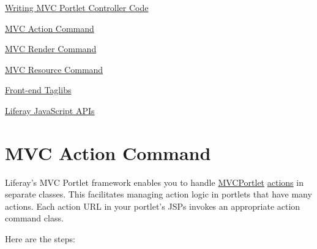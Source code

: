 \href{/docs/7-2/appdev/-/knowledge_base/a/writing-mvc-portlet-controller-code}{Writing
MVC Portlet Controller Code}

\href{/docs/7-2/appdev/-/knowledge_base/a/mvc-action-command}{MVC Action
Command}

\href{/docs/7-2/appdev/-/knowledge_base/a/mvc-render-command}{MVC Render
Command}

\href{/docs/7-2/appdev/-/knowledge_base/a/mvc-resource-command}{MVC
Resource Command}

\href{/docs/7-2/reference/-/knowledge_base/r/front-end-taglibs}{Front-end
Taglibs}

\href{https://portal.liferay.dev/docs/7-2/reference/-/knowledge_base/r/liferay-javascript-apis}{Liferay
JavaScript APIs}

\chapter{MVC Action Command}\label{mvc-action-command}

Liferay's MVC Portlet framework enables you to handle
\href{/docs/7-2/appdev/-/knowledge_base/a/liferay-mvc-portlet}{MVCPortlet}
\href{/docs/7-2/appdev/-/knowledge_base/a/configuring-the-view-layer\#using-action-urls}{actions}
in separate classes. This facilitates managing action logic in portlets
that have many actions. Each action URL in your portlet's JSPs invokes
an appropriate action command class.

Here are the steps:

